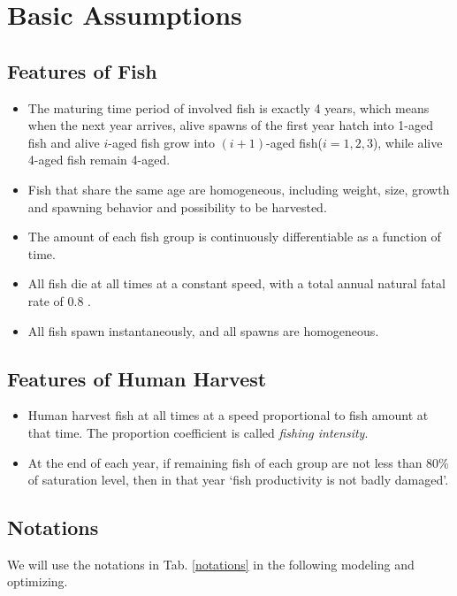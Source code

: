\documentclass{IEEEtran}
\begin{document}
\section{Basic Assumptions}
\subsection{Features of Fish}
\begin{itemize}
\item {The maturing time period of involved fish is exactly 4 years, which means when the next year arrives, alive spawns of the first year hatch into 1-aged fish and alive $i$-aged fish grow into $(i+1)$-aged fish($i=1,2,3$), while alive 4-aged fish remain 4-aged.}
\item {Fish that share the same age are homogeneous, including weight, size, growth and spawning behavior and possibility to be harvested.}
\item {The amount of each fish group is continuously differentiable as a function of time.}
\item {All fish die at all times at a constant speed, with a total annual natural fatal rate of 0.8 .}
\item {All fish spawn instantaneously, and all spawns are homogeneous. }
\end{itemize}

\subsection{Features of Human Harvest}
\begin{itemize}
\item {Human harvest fish at all times at a speed proportional to fish amount at that time. The proportion coefficient is called \textit{fishing intensity}.}
\item {At the end of each year, if remaining fish of each group are not less than 80\% of saturation level, then in that year `fish productivity is not badly damaged'.}
\end{itemize}

\subsection{Notations}
We will use the notations in Tab. \ref{notations} in the following modeling and optimizing.
\end{document}
